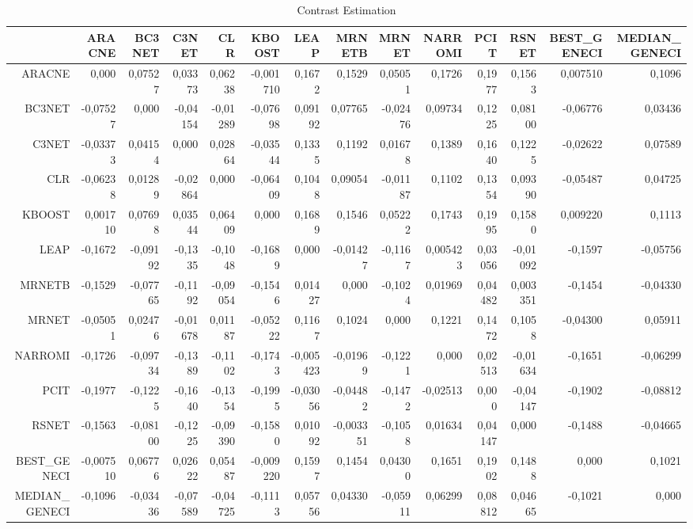 \documentclass[a4paper,10pt]{article}
\begin{document}
\begin{landscape}
\begin{table}[!htp]
\centering\tiny
\caption{Contrast Estimation}
\begin{tabular}{
|r|r|r|r|r|r|r|r|r|r|r|r|r|r|}
\hline
 &ARACNE&BC3NET&C3NET&CLR&KBOOST&LEAP&MRNETB&MRNET&NARROMI&PCIT&RSNET&BEST_GENECI&MEDIAN_GENECI\\
\hline
ARACNE&0,000&0,07527&0,03373&0,06238&-0,001710&0,1672&0,1529&0,05051&0,1726&0,1977&0,1563&0,007510&0,1096\\
\hline
BC3NET&-0,07527&0,000&-0,04154&-0,01289&-0,07698&0,09192&0,07765&-0,02476&0,09734&0,1225&0,08100&-0,06776&0,03436\\
\hline
C3NET&-0,03373&0,04154&0,000&0,02864&-0,03544&0,1335&0,1192&0,01678&0,1389&0,1640&0,1225&-0,02622&0,07589\\
\hline
CLR&-0,06238&0,01289&-0,02864&0,000&-0,06409&0,1048&0,09054&-0,01187&0,1102&0,1354&0,09390&-0,05487&0,04725\\
\hline
KBOOST&0,001710&0,07698&0,03544&0,06409&0,000&0,1689&0,1546&0,05222&0,1743&0,1995&0,1580&0,009220&0,1113\\
\hline
LEAP&-0,1672&-0,09192&-0,1335&-0,1048&-0,1689&0,000&-0,01427&-0,1167&0,005423&0,03056&-0,01092&-0,1597&-0,05756\\
\hline
MRNETB&-0,1529&-0,07765&-0,1192&-0,09054&-0,1546&0,01427&0,000&-0,1024&0,01969&0,04482&0,003351&-0,1454&-0,04330\\
\hline
MRNET&-0,05051&0,02476&-0,01678&0,01187&-0,05222&0,1167&0,1024&0,000&0,1221&0,1472&0,1058&-0,04300&0,05911\\
\hline
NARROMI&-0,1726&-0,09734&-0,1389&-0,1102&-0,1743&-0,005423&-0,01969&-0,1221&0,000&0,02513&-0,01634&-0,1651&-0,06299\\
\hline
PCIT&-0,1977&-0,1225&-0,1640&-0,1354&-0,1995&-0,03056&-0,04482&-0,1472&-0,02513&0,000&-0,04147&-0,1902&-0,08812\\
\hline
RSNET&-0,1563&-0,08100&-0,1225&-0,09390&-0,1580&0,01092&-0,003351&-0,1058&0,01634&0,04147&0,000&-0,1488&-0,04665\\
\hline
BEST_GENECI&-0,007510&0,06776&0,02622&0,05487&-0,009220&0,1597&0,1454&0,04300&0,1651&0,1902&0,1488&0,000&0,1021\\
\hline
MEDIAN_GENECI&-0,1096&-0,03436&-0,07589&-0,04725&-0,1113&0,05756&0,04330&-0,05911&0,06299&0,08812&0,04665&-0,1021&0,000\\
\hline

\end{tabular}
\end{table}


\end{landscape}
\end{document}
